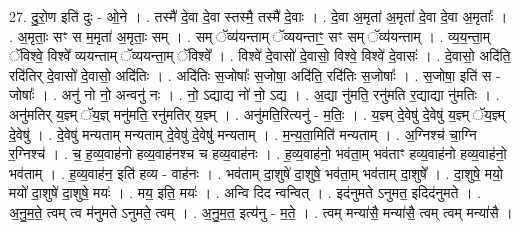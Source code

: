 \documentclass[17pt]{extarticle}
\begin{document}
27. दु॒रो॒ण इति॑ दुः - ओ॒ने । . तस्मै॑ दे॒वा दे॒वा स्तस्मै॒ तस्मै॑ दे॒वाः । . दे॒वा अ॒मृता॑ अ॒मृता॑ दे॒वा दे॒वा अ॒मृताः᳚ । . अ॒मृताः॒ सꣳ स म॒मृता॑ अ॒मृताः॒ सम् । . सम् ॅव्य॑यन्ताम् ॅव्ययन्ताꣳ॒॒ सꣳ सम् ॅव्य॑यन्ताम् । . व्य॒य॒न्ता॒म् ॅविश्वे॒ विश्वे᳚ व्ययन्ताम् ॅव्ययन्ता॒म् ॅविश्वे᳚ । . विश्वे॑ दे॒वासो॑ दे॒वासो॒ विश्वे॒ विश्वे॑ दे॒वासः॑ । . दे॒वासो॒ अदि॑ति॒ रदि॑तिर् दे॒वासो॑ दे॒वासो॒ अदि॑तिः । . अदि॑तिः स॒जोषाः᳚ स॒जोषा॒ अदि॑ति॒ रदि॑तिः स॒जोषाः᳚ । . स॒जोषा॒ इति॑ स - जोषाः᳚ । . अनु॑ नो नो॒ अन्वनु॑ नः । . नो॒ ऽद्याद्य नो॑ नो॒ ऽद्य । . अ॒द्या नु॑मति॒ रनु॑मति र॒द्याद्या नु॑मतिः । . अनु॑मतिर् य॒ज्ञ्म् ॅय॒ज्ञ् मनु॑मति॒ रनु॑मतिर् य॒ज्ञ्म् । . अनु॑मति॒रित्यनु॑ - म॒तिः॒ । . य॒ज्ञ्म् दे॒वेषु॑ दे॒वेषु॑ य॒ज्ञ्म् ॅय॒ज्ञ्म् दे॒वेषु॑ । . दे॒वेषु॑ मन्यताम् मन्यताम् दे॒वेषु॑ दे॒वेषु॑ मन्यताम् । . म॒न्य॒ता॒मिति॑ मन्यताम् । . अ॒ग्निश्च॑ चा॒ग्नि र॒ग्निश्च॑ । . च॒ ह॒व्य॒वाह॑नो हव्य॒वाह॑नश्च च हव्य॒वाह॑नः । . ह॒व्य॒वाह॑नो॒ भव॑ता॒म् भव॑ताꣳ हव्य॒वाह॑नो हव्य॒वाह॑नो॒ भव॑ताम् । . ह॒व्य॒वाह॑न॒ इति॑ हव्य - वाह॑नः । . भव॑ताम् दा॒शुषे॑ दा॒शुषे॒ भव॑ता॒म् भव॑ताम् दा॒शुषे᳚ । . दा॒शुषे॒ मयो॒ मयो॑ दा॒शुषे॑ दा॒शुषे॒ मयः॑ । . मय॒ इति॒ मयः॑ । . अन्वि दिद न्वन्वित् । . इद॑नुमते ऽनुमत॒ इदिद॑नुमते । . अ॒नु॒म॒ते॒ त्वम् त्व म॑नुमते ऽनुमते॒ त्वम् । . अ॒नु॒म॒त॒ इत्य॑नु - म॒ते॒ । . त्वम् मन्या॑सै॒ मन्या॑सै॒ त्वम् त्वम् मन्या॑सै । \newline
\end{document}
